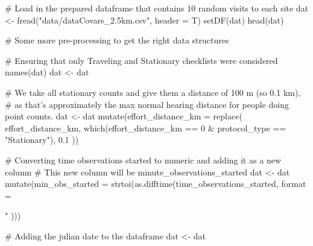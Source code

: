 \documentclass[]{article}
\newenvironment{Shaded}{}{}
\newcommand{\CommentTok}[1]{\textcolor[rgb]{0.00,0.50,0.00}{#1}}
\newcommand{\DataTypeTok}[1]{#1}
\newcommand{\DecValTok}[1]{#1}
\newcommand{\FloatTok}[1]{#1}
\newcommand{\KeywordTok}[1]{\textcolor[rgb]{0.00,0.00,1.00}{#1}}
\newcommand{\NormalTok}[1]{#1}
\newcommand{\OperatorTok}[1]{#1}
\newcommand{\StringTok}[1]{\textcolor[rgb]{0.00,0.50,0.50}{#1}}
\begin{document}
\begin{Shaded}
\begin{Highlighting}[]
\CommentTok{# Load in the prepared dataframe that contains 10 random visits to each site}
\NormalTok{dat <-}\StringTok{ }\KeywordTok{fread}\NormalTok{(}\StringTok{"data/dataCovars_2.5km.csv"}\NormalTok{, }\DataTypeTok{header =}\NormalTok{ T)}
\KeywordTok{setDF}\NormalTok{(dat)}
\KeywordTok{head}\NormalTok{(dat)}

\CommentTok{# Some more pre-processing to get the right data structures}

\CommentTok{# Ensuring that only Traveling and Stationary checklists were considered}
\KeywordTok{names}\NormalTok{(dat)}
\NormalTok{dat <-}\StringTok{ }\NormalTok{dat }\OperatorTok{%

\CommentTok{# We take all stationary counts and give them a distance of 100 m (so 0.1 km),}
\CommentTok{# as that's approximately the max normal hearing distance for people doing point counts.}
\NormalTok{dat <-}\StringTok{ }\NormalTok{dat }\OperatorTok{%
\StringTok{  }\KeywordTok{mutate}\NormalTok{(}\DataTypeTok{effort_distance_km =} \KeywordTok{replace}\NormalTok{(}
\NormalTok{    effort_distance_km,}
    \KeywordTok{which}\NormalTok{(effort_distance_km }\OperatorTok{==}\StringTok{ }\DecValTok{0} \OperatorTok{&}
\StringTok{      }\NormalTok{protocol_type }\OperatorTok{==}\StringTok{ "Stationary"}\NormalTok{),}
    \FloatTok{0.1}
\NormalTok{  ))}

\CommentTok{# Converting time observations started to numeric and adding it as a new column}
\CommentTok{# This new column will be minute_observations_started}
\NormalTok{dat <-}\StringTok{ }\NormalTok{dat }\OperatorTok{%
\StringTok{  }\KeywordTok{mutate}\NormalTok{(}\DataTypeTok{min_obs_started =} \KeywordTok{strtoi}\NormalTok{(}\KeywordTok{as.difftime}\NormalTok{(time_observations_started,}
    \DataTypeTok{format =} \StringTok{"%
\NormalTok{  )))}

\CommentTok{# Adding the julian date to the dataframe}
\NormalTok{dat <-}\StringTok{ }\NormalTok{dat }\OperatorTok{%

}}}}}
\end{Highlighting}
\end{Shaded}
\end{document}
